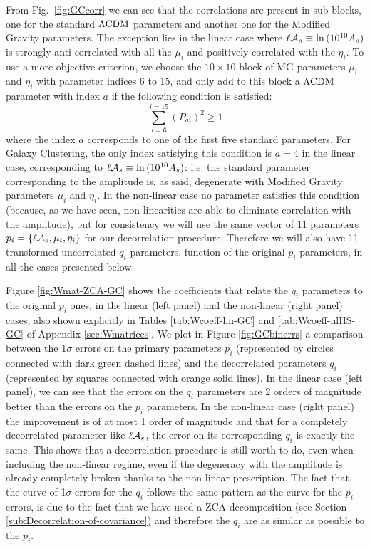 From Fig.\ \ref{fig:GCcorr} we can see that the correlations are present in sub-blocks, one for 
the standard $\Lambda\mathrm{CDM}$ parameters and another one for the Modified Gravity parameters. The exception lies in the linear case
where $\ell \mathcal{A}_{s} \equiv \ln{(10^{10}A_s)}$ is strongly anti-correlated with all the $\mu_i$ and positively correlated with the $\eta_i$. 
To use a more objective criterion, we choose the $10\times 10$ block of MG parameters $\mu_i$ and $\eta_i$ with parameter indices 6 to 15, and only add to this block a $\Lambda\mathrm{CDM}$ parameter with index $a$
if the following condition is satisfied:
\[
 \sum_{i=6}^{i=15}(P_{ai})^2 \geq 1
\]
where the index $a$ corresponds to one of the first five standard parameters. For Galaxy Clustering, the only index satisfying this condition is $a=4$ in the linear case, corresponding to $\ell \mathcal{A}_{s} \equiv \ln{(10^{10}A_s)}$: i.e. the standard parameter corresponding to the amplitude is, as said, degenerate with Modified Gravity parameters $\mu_i$ and $\eta_i$.
In the non-linear case no parameter satisfies this condition (because, as we have seen, non-linearities are able to eliminate correlation with the amplitude), but for consistency we will use the same vector of 11 parameters
$p_i = \left\{ \ell \mathcal{A}_{s}, \mu_i, \eta_i \right\}$ for our decorrelation procedure.
Therefore we will also have 11 transformed uncorrelated $q_i$ parameters, function of the original $p_i$ parameters, in all the cases presented below. 


Figure \ref{fig:Wmat-ZCA-GC} shows the coefficients that relate the 
$q_i$ parameters to the original $p_i$ ones, in the linear (left panel) and the non-linear (right panel) cases, also shown explicitly in Tables
\ref{tab:Wcoeff-lin-GC} and \ref{tab:Wcoeff-nlHS-GC} of Appendix \ref{sec:Wmatrices}.
We plot in Figure \ref{fig:GCbinerrs} a comparison between the 1$\sigma$ errors on the primary parameters $p_i$ 
(represented by circles connected with dark green dashed lines) and the decorrelated parameters $q_i$ 
(represented by squares connected with orange solid lines). 
In the linear case (left panel), we can see that the errors on the $q_i$ parameters are 2 orders of magnitude 
better than the errors on the $p_i$ parameters. In the non-linear case (right panel) the improvement is of at most 1 order of magnitude 
and that for a completely decorrelated parameter like $\ell \mathcal{A}_{s}$, 
the error on its corresponding $q_i$ is exactly the same. 
This shows that a decorrelation procedure is still worth to do, even when including the non-linear regime, 
even if the degeneracy with the amplitude is already completely broken thanks to the non-linear prescription.
The fact that the curve of 1$\sigma$ errors for the $q_i$ follows the same pattern as the curve for the $p_i$ errors, 
is due to the fact that we have used a ZCA decomposition 
(see Section \ref{sub:Decorrelation-of-covariance}) and therefore the $q_i$ are as similar as possible to the $p_i$.


